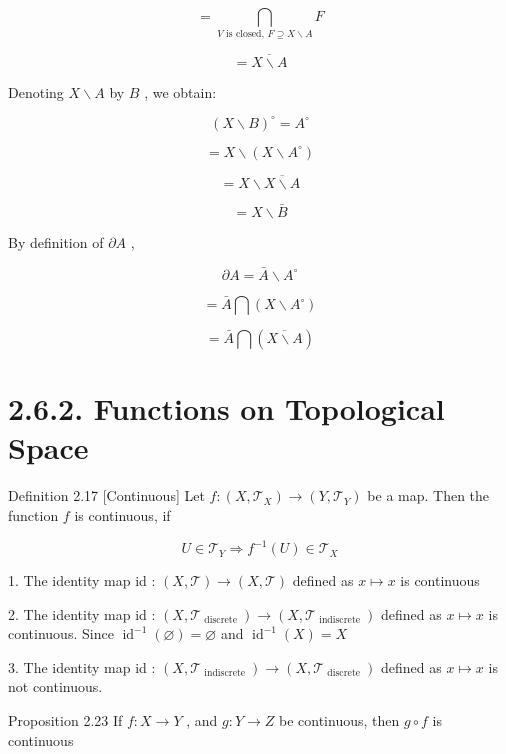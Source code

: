 \[
= \mathop{\bigcap }\limits_{{V\text{ is closed, }F \supseteq  X \smallsetminus  A}}F \tag{2.2c}
\]

\[
= \overline{X \smallsetminus  A} \tag{2.2d}
\]

Denoting \(X \smallsetminus  A\) by \(B\) , we obtain:

\[
{\left( X \smallsetminus  B\right) }^{ \circ  } = {A}^{ \circ  } \tag{2.3a}
\]

\[
= X \smallsetminus  \left( {X \smallsetminus  {A}^{ \circ  }}\right)  \tag{2.3b}
\]

\[
= X \smallsetminus  \overline{X \smallsetminus  A} \tag{2.3c}
\]

\[
= X \smallsetminus  \bar{B} \tag{2.3d}
\]

By definition of \(\partial A\) ,

\[
\partial A = \bar{A} \smallsetminus  {A}^{ \circ  } \tag{2.4a}
\]

\[
= \bar{A}\bigcap \left( {X \smallsetminus  {A}^{ \circ  }}\right)  \tag{2.4b}
\]

\[
= \bar{A}\bigcap \left( \overline{X \smallsetminus  A}\right)  \tag{2.4c}
\]

\section*{2.6.2. Functions on Topological Space}

Definition 2.17 [Continuous] Let \(f : \left( {X,{\mathcal{T}}_{X}}\right)  \rightarrow  \left( {Y,{\mathcal{T}}_{Y}}\right)\) be a map. Then the function \(f\) is continuous, if

\[
U \in  {\mathcal{T}}_{Y} \Rightarrow  {f}^{-1}\left( U\right)  \in  {\mathcal{T}}_{X}
\]

1. The identity map id : \(\left( {X,\mathcal{T}}\right)  \rightarrow  \left( {X,\mathcal{T}}\right)\) defined as \(x \mapsto  x\) is continuous

2. The identity map id : \(\left( {X,{\mathcal{T}}_{\text{ discrete }}}\right)  \rightarrow  \left( {X,{\mathcal{T}}_{\text{ indiscrete }}}\right)\) defined as \(x \mapsto  x\) is continuous. Since \({\operatorname{id}}^{-1}\left( \varnothing \right)  = \varnothing\) and \({\operatorname{id}}^{-1}\left( X\right)  = X\)

3. The identity map id : \(\left( {X,{\mathcal{T}}_{\text{ indiscrete }}}\right)  \rightarrow  \left( {X,{\mathcal{T}}_{\text{ discrete }}}\right)\) defined as \(x \mapsto  x\) is not continuous.

Proposition 2.23 If \(f : X \rightarrow  Y\) , and \(g : Y \rightarrow  Z\) be continuous, then \(g \circ  f\) is continuous

